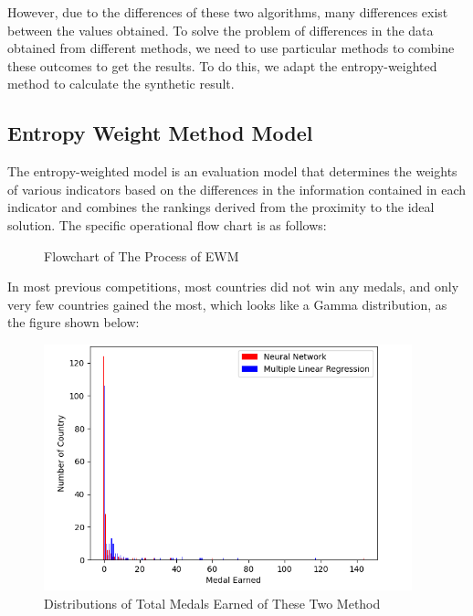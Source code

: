 \documentclass{mcmthesis}
\begin{document}
However, due to the differences of these two algorithms, many differences exist between the values obtained. To solve the problem of differences in the data obtained from different methods, we need to use particular methods to combine these outcomes to get the results. To do this, we adapt the entropy-weighted method to calculate the synthetic result.

\subsection{Entropy Weight Method Model}
The entropy-weighted model is an evaluation model that determines the weights of various indicators based on the differences in the information contained in each indicator and combines the rankings derived from the proximity to the ideal solution. The specific operational flow chart is as follows:
\begin{figure}[H]
\centering
{}
\caption{Flowchart of The Process of EWM}
\label{fig:flowchart}
\end{figure}
In most previous competitions, most countries did not win any medals, and only very few countries gained the most, which looks like a Gamma distribution, as the figure shown below:\\
\begin{figure}[H]
  \centering
  \includegraphics[width=0.95\textwidth]{myplot} %
  \caption{Distributions of Total Medals Earned of These Two Method }
  \label{exampleId}
\end{figure}
\end{document}

